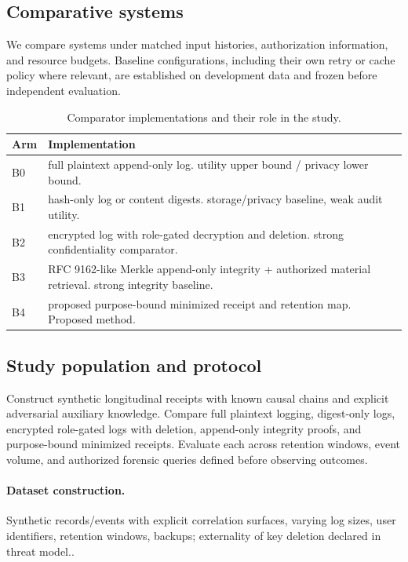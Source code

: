 \documentclass[11pt,a4paper]{article}
\begin{document}
\subsection{Comparative systems}
We compare systems under matched input histories, authorization information, and resource budgets. Baseline configurations, including their own retry or cache policy where relevant, are established on development data and frozen before independent evaluation.
\begin{table}[ht]
\centering\footnotesize
\caption{Comparator implementations and their role in the study.}
\begin{tabularx}{\linewidth}{@{}lX@{}}\toprule
Arm & Implementation \\ \midrule
B0 & full plaintext append-only log. utility upper bound / privacy lower bound. \\ 
B1 & hash-only log or content digests. storage/privacy baseline, weak audit utility. \\ 
B2 & encrypted log with role-gated decryption and deletion. strong confidentiality comparator. \\ 
B3 & RFC 9162-like Merkle append-only integrity + authorized material retrieval. strong integrity baseline. \\ 
B4 & proposed purpose-bound minimized receipt and retention map. Proposed method. \\ 
\bottomrule\end{tabularx}
\end{table}

\subsection{Study population and protocol}
Construct synthetic longitudinal receipts with known causal chains and explicit adversarial auxiliary knowledge. Compare full plaintext logging, digest-only logs, encrypted role-gated logs with deletion, append-only integrity proofs, and purpose-bound minimized receipts. Evaluate each across retention windows, event volume, and authorized forensic queries defined before observing outcomes.

\paragraph{Dataset construction.} Synthetic records/events with explicit correlation surfaces, varying log sizes, user identifiers, retention windows, backups; externality of key deletion declared in threat model..
\end{document}
